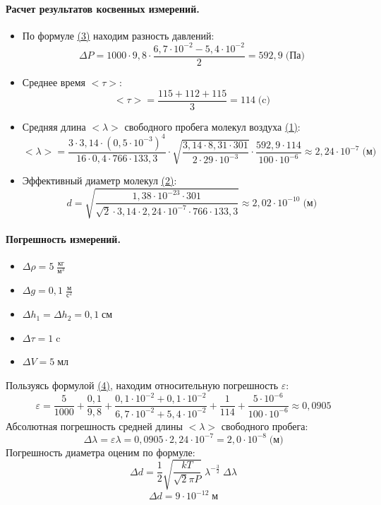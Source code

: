 \documentclass{article}
\begin{document}
\paragraph{Расчет результатов косвенных измерений.}
\begin{itemize}
	\item По формуле \hyperlink{formuls}{(3)} находим разность давлений:
	$$ \Delta P=1000\cdot9,8\cdot\frac{6,7\cdot10^{-2}-5,4\cdot10^{-2}}{2}=592,9\;\mbox{(Па)}$$
	\item Среднее время $<\tau>$:
	$$<\tau>=\frac{115+112+115}{3}=114\;\mbox{(c)}$$
	\item Средняя длина $<\lambda>$ свободного пробега молекул воздуха \hyperlink{formuls}{(1)}:
	$$<\lambda>=\frac{3\cdot3,14\cdot(0,5\cdot10^{-3})^4}{16\cdot0,4\cdot766\cdot133,3}\cdot\sqrt{\frac{3,14\cdot8,31\cdot301}{2\cdot29\cdot10^{-3}}}\cdot\frac{592,9\cdot114}{100\cdot10^{-6}}\approx2,24\cdot10^{-7}\;\mbox{(м)}$$
	\item Эффективный диаметр молекул \hyperlink{formuls}{(2)}:
	$$d=\sqrt{\frac{1,38\cdot10^{-23}\cdot301}{\sqrt{2}\cdot3,14\cdot2,24\cdot10^{-7}\cdot766\cdot133,3}}\approx2,02\cdot10^{-10}\;\mbox{(м)}$$
\end{itemize}

\paragraph{Погрешность измерений.}
\begin{itemize}
\item $\Delta\rho=5\;\frac{\mbox{кг}}{\mbox{м}^3}$
\item$\Delta g=0,1\;\frac{\mbox{м}}{\mbox{с}^2}$
\item$\Delta h_1=\Delta h_2=0,1\;\mbox{см}$
\item$\Delta \tau=1\;\mbox{c}$
\item$\Delta V=5\;\mbox{мл}$
\end{itemize}
Пользуясь формулой \hyperlink{formuls}{(4)}, находим относительную погрешность $\varepsilon$:
$$\varepsilon=\frac{5}{1000}+\frac{0,1}{9,8}+\frac{0,1\cdot10^{-2}+0,1\cdot10^{-2}}{6,7\cdot10^{-2}+5,4\cdot10^{-2}}+\frac{1}{114}+\frac{5\cdot10^{-6}}{100\cdot10^{-6}}\approx0,0905$$
Абсолютная погрешность средней длины $<\lambda>$  свободного пробега:
$$\Delta \lambda=\varepsilon\lambda=0,0905\cdot2,24\cdot10^{-7}=2,0\cdot10^{-8}\;\mbox{(м)}$$
Погрешность диаметра оценим по формуле:
$$ \Delta d=\frac{1}{2}\sqrt{\frac{kT}{\sqrt{2}\pi P}}\;\lambda^{-\frac{3}{2}}\;\Delta\lambda$$
$$ \Delta d=9\cdot10^{-12}\;\mbox{м}$$
\end{document}
